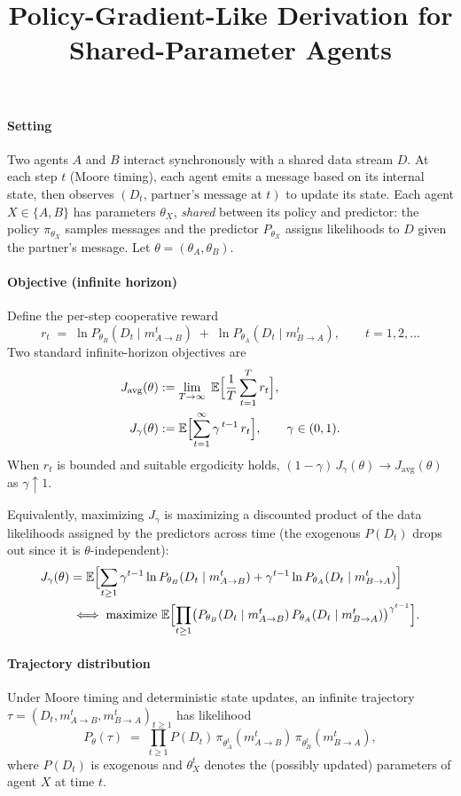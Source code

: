 \documentclass{article}
\title{Policy-Gradient-Like Derivation for Shared-Parameter Agents}
\author{}
\date{}
\begin{document}
\maketitle

\paragraph{Setting}
Two agents $A$ and $B$ interact synchronously with a shared data stream $D$. At each step $t$ (Moore timing), each agent emits a message based on its internal state, then observes $(D_t,\, \text{partner's message at }t)$ to update its state. Each agent $X\in\{A,B\}$ has parameters $\theta_X$, \emph{shared} between its policy and predictor: the policy $\pi_{\theta_X}$ samples messages and the predictor $P_{\theta_X}$ assigns likelihoods to $D$ given the partner's message. Let $\theta=(\theta_A,\theta_B)$.

\paragraph{Objective (infinite horizon)}
Define the per-step cooperative reward
\[
  r_t\;=\; \ln P_{\theta_B}(D_t\mid m_{A\to B}^t)\; +\; \ln P_{\theta_A}(D_t\mid m_{B\to A}^t),\qquad t=1,2,\dots
\]
Two standard infinite-horizon objectives are
\begin{align*}
  J_{\mathrm{avg}}(\theta)
  &:= \lim_{T\to\infty} \; \mathbb{E}\Bigl[\frac{1}{T}\sum_{t=1}^{T} r_t\Bigr],\\
  J_{\gamma}(\theta)
  &:= \mathbb{E}\Bigl[\sum_{t=1}^{\infty} \gamma^{\,t-1}\, r_t\Bigr],\qquad \gamma\in(0,1).
\end{align*}
When $r_t$ is bounded and suitable ergodicity holds, $(1-\gamma)\,J_{\gamma}(\theta)\to J_{\mathrm{avg}}(\theta)$ as $\gamma\uparrow 1$.

Equivalently, maximizing $J_\gamma$ is maximizing a discounted product of the data likelihoods assigned by the predictors across time (the exogenous $P(D_t)$ drops out since it is $\theta$-independent):
\begin{align}
  J_\gamma(\theta) &= \mathbb{E}\Bigl[\sum_{t\ge 1} \gamma^{t-1} \ln P_{\theta_B}(D_t\mid m_{A\to B}^t) + \gamma^{t-1} \ln P_{\theta_A}(D_t\mid m_{B\to A}^t)\Bigr] \\
  &\iff \text{maximize } \mathbb{E}\Bigl[\prod_{t\ge 1} \bigl(P_{\theta_B}(D_t\mid m_{A\to B}^t)\,P_{\theta_A}(D_t\mid m_{B\to A}^t)\bigr)^{\gamma^{t-1}}\Bigr].
\end{align}
\paragraph{Trajectory distribution}
Under Moore timing and deterministic state updates, an infinite trajectory $\tau=(D_t,m_{A\to B}^t,m_{B\to A}^t)_{t\ge 1}$ has likelihood
\[
P_\theta(\tau) \;=\; \prod_{t\ge 1} P(D_t)\, \pi_{\theta_A^{t}}(m_{A\to B}^t)\, \pi_{\theta_B^{t}}(m_{B\to A}^t),
\]
where $P(D_t)$ is exogenous and $\theta_X^{t}$ denotes the (possibly updated) parameters of agent $X$ at time $t$.
\end{document}
